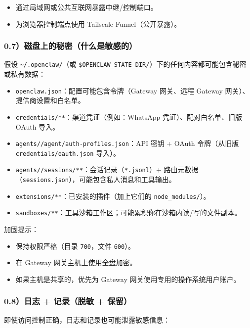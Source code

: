 \begin{itemize}
  \item 通过局域网或公共互联网暴露中继/控制端口。
  \item 为浏览器控制端点使用 Tailscale Funnel（公开暴露）。
\end{itemize}


\subsubsection{0.7）磁盘上的秘密（什么是敏感的）}


假设 \texttt{\textasciitilde{}/.openclaw/}（或 \texttt{\$OPENCLAW\_STATE\_DIR/}）下的任何内容都可能包含秘密或私有数据：

\begin{itemize}
  \item \texttt{openclaw.json}：配置可能包含令牌（Gateway 网关、远程 Gateway 网关）、提供商设置和白名单。
  \item \texttt{credentials/**}：渠道凭证（例如：WhatsApp 凭证）、配对白名单、旧版 OAuth 导入。
  \item \texttt{agents//agent/auth-profiles.json}：API 密钥 + OAuth 令牌（从旧版 \texttt{credentials/oauth.json} 导入）。
  \item \texttt{agents//sessions/**}：会话记录（\texttt{*.jsonl}）+ 路由元数据（\texttt{sessions.json}），可能包含私人消息和工具输出。
  \item \texttt{extensions/**}：已安装的插件（加上它们的 \texttt{node\_modules/}）。
  \item \texttt{sandboxes/**}：工具沙箱工作区；可能累积你在沙箱内读/写的文件副本。
\end{itemize}


加固提示：

\begin{itemize}
  \item 保持权限严格（目录 \texttt{700}，文件 \texttt{600}）。
  \item 在 Gateway 网关主机上使用全盘加密。
  \item 如果主机是共享的，优先为 Gateway 网关使用专用的操作系统用户账户。
\end{itemize}


\subsubsection{0.8）日志 + 记录（脱敏 + 保留）}


即使访问控制正确，日志和记录也可能泄露敏感信息：


